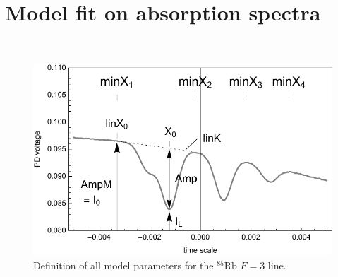 \pagebreak
\section{Model fit on absorption spectra}~\label{sec:modelfit} %
\begin{figure}[H]
    \centering
    \includegraphics[width=.6\textwidth]{spectrumlegend}
    \caption{\label{fig:spectrumlegend} Definition of all model parameters for the
    \(^{85}\)Rb \(F=3\) line.}
\end{figure}

